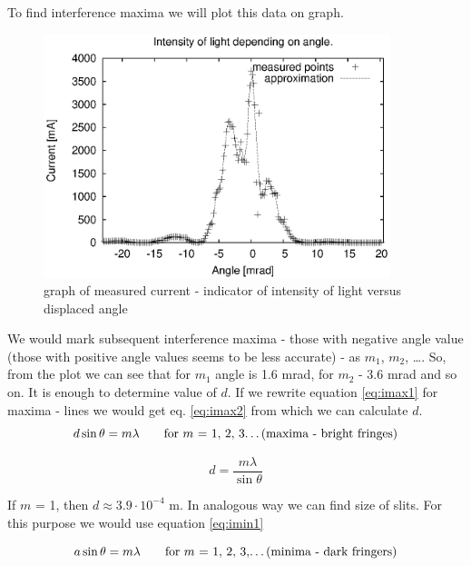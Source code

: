 \documentclass[a4paper,12pt]{article}
\begin{document}
To find interference maxima we will plot this data on graph. 

\begin{figure}[H]
    \begin{center}
        \includegraphics[width=0.90\textwidth]{plot}
        \caption{graph of measured current - indicator of intensity of light versus displaced angle}
        \label{fig:plot}
    \end{center}
\end{figure}

We would mark subsequent interference maxima - those with negative angle value (those with positive angle values seems to be less accurate) - as $m_1$, $m_2$, \dots. So, from the plot we can see that for $m_1$ angle is 1.6 mrad, for $m_2$ - 3.6 mrad and so on. It is enough to determine value of $d$. If we rewrite equation \ref{eq:imax1} for maxima - lines we would get eq. \ref{eq:imax2} from which we can calculate $d$.
\begin{equation}
    d \sin \theta = m \lambda \qquad \textrm{for $m$ = 1, 2, 3\dots (maxima - bright fringes)} \label{eq:imax1}
\end{equation}

\begin{equation}
    d = \frac{m \lambda}{\sin \theta} \label{eq:imax2}
\end{equation}

If $m$ = 1, then $d \approx 3.9 \cdot 10^{-4}$ m. In analogous way we can find size of slits. For this purpose we would use equation \ref{eq:imin1}

\begin{equation}
    a \sin \theta = m \lambda \qquad \textrm{for $m$ = 1, 2, 3,\dots (minima - dark fringers)} \label{eq:imin1}
\end{equation}
\end{document}
